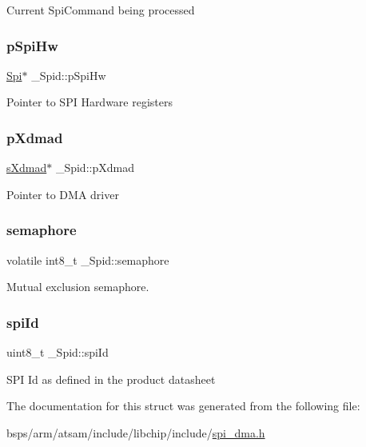 Current Spi\+Command being processed \mbox{\label{struct__Spid_aa046dd759912f39b616863926db26b47}} 
\subsubsection{\texorpdfstring{pSpiHw}{pSpiHw}}
{\footnotesize\ttfamily \mbox{\hyperlink{structSpi}{Spi}}$\ast$ \+\_\+\+Spid\+::p\+Spi\+Hw}

Pointer to S\+PI Hardware registers \mbox{\label{struct__Spid_ac3ece7ebbc89a2c505a826c96fd031dc}} 
\subsubsection{\texorpdfstring{pXdmad}{pXdmad}}
{\footnotesize\ttfamily \mbox{\hyperlink{group__dmad__structs_gaf2c13151514615a6beb35c0d868a5053}{s\+Xdmad}}$\ast$ \+\_\+\+Spid\+::p\+Xdmad}

Pointer to D\+MA driver \mbox{\label{struct__Spid_ada6512a0b9e6ce08abef0b8eb7020f65}} 
\subsubsection{\texorpdfstring{semaphore}{semaphore}}
{\footnotesize\ttfamily volatile int8\+\_\+t \+\_\+\+Spid\+::semaphore}

Mutual exclusion semaphore. \mbox{\label{struct__Spid_aaf4a3132d4eea5819a631a76228036f4}} 
\subsubsection{\texorpdfstring{spiId}{spiId}}
{\footnotesize\ttfamily uint8\+\_\+t \+\_\+\+Spid\+::spi\+Id}

S\+PI Id as defined in the product datasheet 

The documentation for this struct was generated from the following file\+:\begin{DoxyCompactItemize}
\item 
bsps/arm/atsam/include/libchip/include/\mbox{\hyperlink{spi__dma_8h}{spi\+\_\+dma.\+h}}\end{DoxyCompactItemize}

